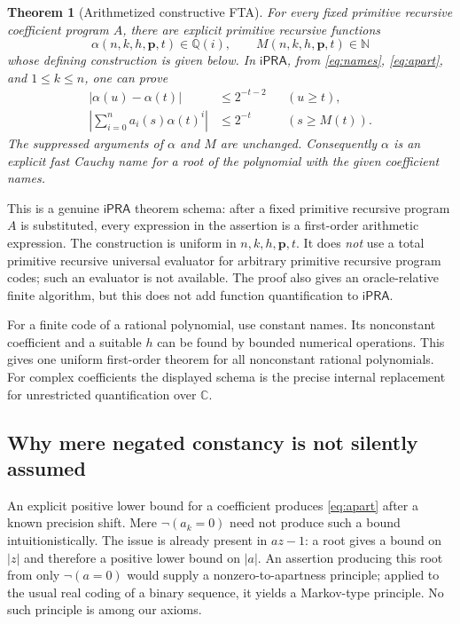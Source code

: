 \documentclass[11pt,letterpaper]{article}
\newtheorem{theorem}{Theorem}[section]
\theoremstyle{definition}\newtheorem{definition}[theorem]{Definition}
\theoremstyle{remark}\newtheorem{remark}[theorem]{Remark}
\newcommand{\ipra}{\mathsf{iPRA}}
\newcommand{\N}{\mathbb N}\newcommand{\Q}{\mathbb Q}
\newcommand{\GQ}{\mathbb Q(i)}\newcommand{\C}{\mathbb C}
\begin{document}
\begin{theorem}[Arithmetized constructive FTA]
\label{thm:main}
For every fixed primitive recursive coefficient program $A$, there are
explicit primitive recursive functions
\[
 \alpha(n,k,h,\mathbf p,t)\in\GQ,
 \qquad M(n,k,h,\mathbf p,t)\in\N
\]
whose defining construction is given below. In $\ipra$, from
\eqref{eq:names}, \eqref{eq:apart}, and $1\le k\le n$, one can prove
\begin{align}
 |\alpha(u)-\alpha(t)|&\le 2^{-t-2} &&(u\ge t),
 \label{eq:main-cauchy}\\
 \left|\sum_{i=0}^n a_i(s)\alpha(t)^i\right|&\le 2^{-t}
                   &&(s\ge M(t)).
 \label{eq:main-root}
\end{align}
The suppressed arguments of $\alpha$ and $M$ are unchanged. Consequently
$\alpha$ is an explicit fast Cauchy name for a root of the polynomial with
the given coefficient names.
\end{theorem}

This is a genuine $\ipra$ theorem schema: after a fixed primitive recursive
program $A$ is substituted, every expression in the assertion is a
first-order arithmetic expression. The construction is uniform in
$n,k,h,\mathbf p,t$. It does \emph{not} use a total primitive recursive
universal evaluator for arbitrary primitive recursive program codes; such an
evaluator is not available. The proof also gives an oracle-relative finite
algorithm, but this does not add function quantification to $\ipra$.

For a finite code of a rational polynomial, use constant names. Its
nonconstant coefficient and a suitable $h$ can be found by bounded numerical
operations. This gives one uniform first-order theorem for all nonconstant
rational polynomials. For complex coefficients the displayed schema is the
precise internal replacement for unrestricted quantification over $\C$.

\subsection{Why mere negated constancy is not silently assumed}

An explicit positive lower bound for a coefficient produces
\eqref{eq:apart} after a known precision shift. Mere
$\neg(a_k=0)$ need not produce such a bound intuitionistically. The issue is
already present in $az-1$: a root gives a bound on $|z|$ and therefore a
positive lower bound on $|a|$. An assertion producing this root from only
$\neg(a=0)$ would supply a nonzero-to-apartness principle; applied to the
usual real coding of a binary sequence, it yields a Markov-type principle.
No such principle is among our axioms.
\end{document}
